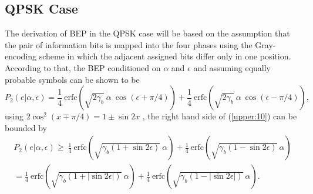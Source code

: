 \subsection{QPSK Case}
The derivation of BEP in the QPSK case will be based on the
assumption that the pair of information bits is mapped into the
four phases using the Gray-encoding scheme in which the adjacent
assigned bits differ only in one position. According to that, the
BEP conditioned on $\alpha$ and $\epsilon$  and assuming equally
probable symbols can be shown to be \cite{prabhu:mar76}
\begin{equation}
\label{upper:10}
P_2(e|\alpha,\epsilon)=\frac{1}{4}~\mbox{erfc}\left(\sqrt{2\gamma_b}~
\alpha~\cos(\epsilon+\pi/4)\right)+\frac{1}{4}~\mbox{erfc}\left(\sqrt{2\gamma_b}~
\alpha~\cos(\epsilon-\pi/4)\right),
\end{equation}
using $2\cos^2(x\mp\pi/4)=1\pm \sin  2x$  , the right hand side of
(\ref{upper:10}) can be bounded by
\begin{equation}
\label{upper:11}
\begin{split}
P_2(e|\alpha,\epsilon)\ge~\frac{1}{4}~\mbox{erfc}\left(\sqrt{\gamma_b(1+\sin2\epsilon)}~
\alpha\right)+\frac{1}{4}~\mbox{erfc}\left(\sqrt{\gamma_b(1-\sin2\epsilon)}~
\alpha\right)\\=\frac{1}{4}~\mbox{erfc}
\left(\sqrt{\gamma_b(1+|\sin2\epsilon|)}~
\alpha\right)+\frac{1}{4}~\mbox{erfc}
\left(\sqrt{\gamma_b(1-|\sin2\epsilon|)}~ \alpha\right).
\end{split}
\end{equation}\\
